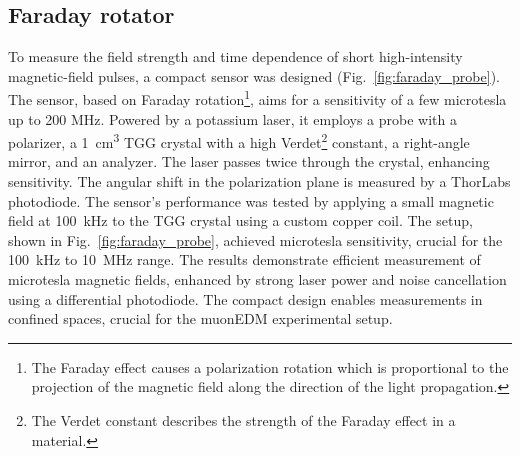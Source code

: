 \begin{refsection}
    \subsection{Faraday rotator}
        To measure the field strength and time dependence of short high-intensity magnetic-field pulses, a compact sensor was designed (Fig.~\ref{fig:faraday_probe}). 
        The sensor, based on Faraday rotation\footnote{The Faraday effect causes a polarization rotation which is proportional to the projection of the magnetic field along the direction of the light propagation.}, aims for a sensitivity of a few microtesla up to 200 MHz. 
        Powered by a potassium laser, it employs a probe with a polarizer, a \SI{1}{\cm\cubed} TGG crystal with a high Verdet\footnote{The Verdet constant describes the strength of the Faraday effect in a material.} constant, a right-angle mirror, and an analyzer. 
        The laser passes twice through the crystal, enhancing sensitivity. 
        The angular shift in the polarization plane is measured by a ThorLabs photodiode.
        The sensor's performance was tested by applying a small magnetic field at \SI{100}{kHz} to the TGG crystal using a custom copper coil. 
        The setup, shown in Fig.~\ref{fig:faraday_probe}, achieved microtesla sensitivity, crucial for the \SI{100}{kHz} to \SI{10}{MHz} range. 
        The results demonstrate efficient measurement of microtesla magnetic fields, enhanced by strong laser power and noise cancellation using a differential photodiode. 
        The compact design enables measurements in confined spaces, crucial for the muonEDM experimental setup.


\end{refsection}
